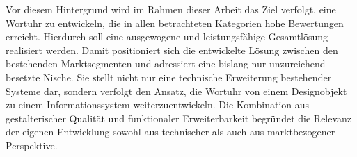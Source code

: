 Vor diesem Hintergrund wird im Rahmen dieser Arbeit das Ziel verfolgt, eine Wortuhr zu entwickeln, die in allen betrachteten Kategorien hohe Bewertungen erreicht. 
Hierdurch soll eine ausgewogene und leistungsfähige Gesamtlösung realisiert werden.
Damit positioniert sich die entwickelte Lösung zwischen den bestehenden Marktsegmenten und adressiert eine bislang nur unzureichend besetzte Nische. 
Sie stellt nicht nur eine technische Erweiterung bestehender Systeme dar, sondern verfolgt den Ansatz, die Wortuhr von einem Designobjekt zu einem Informationssystem weiterzuentwickeln. 
Die Kombination aus gestalterischer Qualität und funktionaler Erweiterbarkeit begründet die Relevanz der eigenen Entwicklung sowohl aus technischer als auch aus marktbezogener Perspektive.
